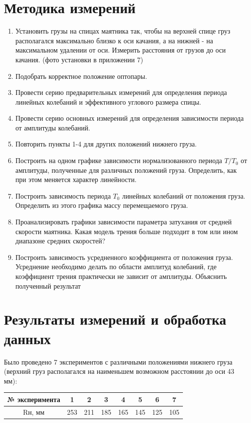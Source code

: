 \documentclass[a4paper]{article}
\begin{document}
\section{Методика измерений}
\begin{enumerate}
\item Установить грузы на спицах маятника так, чтобы на верхней спице груз располагался максимально близко к оси качания, а на нижней - на максимальном удалении от оси. Измерить расстояния от грузов до оси качания. (фото установки в приложении 7)
\item Подобрать корректное положение оптопары. 
\item Провести серию предварительных измерений для определения периода линейных колебаний и эффективного углового размера спицы.
\item Провести серию основных измерений для определения зависимости периода от амплитуды колебаний.
\item Повторить пункты 1-4 для других положений нижнего груза.
\item Построить на одном графике зависимости нормализованного периода $T/T_0$ от амплитуды, полученные для различных положений груза. Определить, как при этом меняется характер линейности.
\item Построить зависимость периода $T_0$ линейных колебаний от положения груза. Определить из этого графика массу перемещаемого груза.
\item Проанализировать графики зависимости параметра затухания от средней скорости маятника. Какая модель трения больше подходит в том или ином диапазоне средних скоростей?
\item Построить зависимость усредненного коэффициента от положения груза. Усреднение необходимо делать по области амплитуд колебаний, где коэффициент трения практически не зависит от амплитуды. Объяснить полученный результат
\end{enumerate}

\section{Результаты измерений и обработка данных}
Было проведено 7 экспериментов с различными положениями нижнего груза (верхний груз располагался на наименьшем возможном расстоянии до оси 43 мм): 
\newpage
\begin{table}[!h]
\begin{tabular}{|c|c|c|c|c|c|c|c|}
\hline
№  эксперимента    & 1     & 2     & 3     & 4     & 5     & 6     & 7     \\ \hline
Rн, мм & 253 & 211 & 185 & 165 & 145 & 125 & 105 \\ \hline
\end{tabular}
\end{table}
\end{document}
